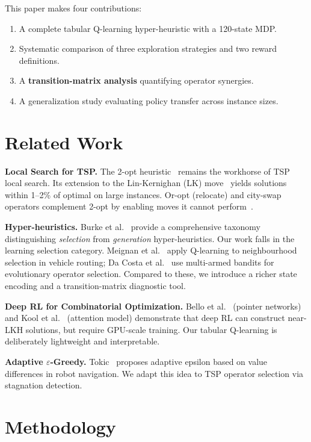 \documentclass[10pt,twocolumn]{article}
\begin{document}
This paper makes four contributions:
\begin{enumerate}\itemsep0pt
  \item A complete tabular Q-learning hyper-heuristic with a 120-state MDP.
  \item Systematic comparison of three exploration strategies and two reward definitions.
  \item A \textbf{transition-matrix analysis} quantifying operator synergies.
  \item A generalization study evaluating policy transfer across instance sizes.
\end{enumerate}

\section{Related Work}

\textbf{Local Search for TSP.}
The 2-opt heuristic~\cite{lin65} remains the workhorse of TSP local search.
Its extension to the Lin-Kernighan (LK) move~\cite{lin73} yields solutions
within 1--2\% of optimal on large instances. Or-opt (relocate) and city-swap
operators complement 2-opt by enabling moves it cannot perform~\cite{or76}.

\textbf{Hyper-heuristics.}
Burke et al.~\cite{burke10} provide a comprehensive taxonomy distinguishing
\emph{selection} from \emph{generation} hyper-heuristics. Our work falls in
the learning selection category. Meignan et al.~\cite{meignan15} apply
Q-learning to neighbourhood selection in vehicle routing; Da Costa et
al.~\cite{dacosta08} use multi-armed bandits for evolutionary operator
selection. Compared to these, we introduce a richer state encoding and a
transition-matrix diagnostic tool.

\textbf{Deep RL for Combinatorial Optimization.}
Bello et al.~\cite{bello16} (pointer networks) and Kool et al.~\cite{kool19}
(attention model) demonstrate that deep RL can construct near-LKH solutions,
but require GPU-scale training. Our tabular Q-learning is deliberately
lightweight and interpretable.

\textbf{Adaptive $\varepsilon$-Greedy.}
Tokic~\cite{tokic10} proposes adaptive epsilon based on value differences in
robot navigation. We adapt this idea to TSP operator selection via
stagnation detection.

\section{Methodology}
\end{document}
